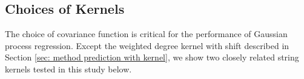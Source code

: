 

\subsection{Choices of Kernels}
\label{sec: Choices of Kernels}

The choice of covariance function is critical for the performance of Gaussian process regression. 
Except the weighted degree kernel with shift described in Section \ref{sec: method prediction with kernel}, we show two closely related string kernels tested in this study below.

